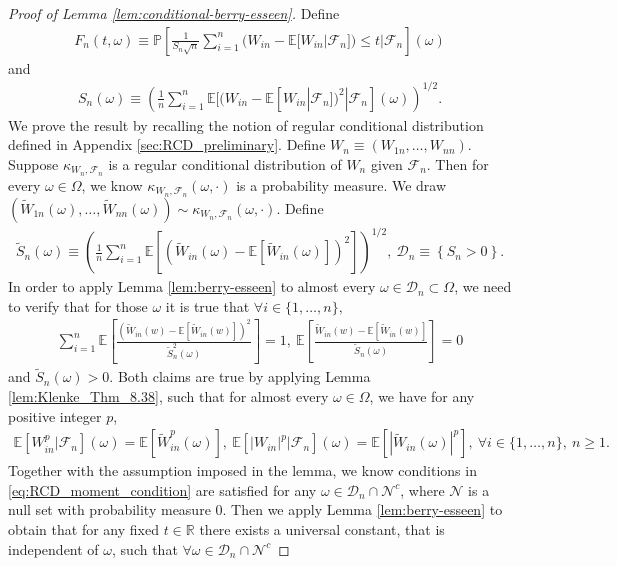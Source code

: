 \documentclass[12pt]{article}
\theoremstyle{definition}
\def\P{\mathbb{P}}
\def\P{\mathbb{P}}
\newcommand{\E}{\mathbb E}								%
\renewcommand{\P}{\mathbb{P}}							%
\begin{document}
	\begin{proof}[Proof of Lemma \ref{lem:conditional-berry-esseen}]
		Define 
		\begin{align*}
			F_n(t,\omega)\equiv \P\left[\frac{1}{S_n\sqrt{n}}\sum_{i=1}^n (W_{in}-\E[W_{in}|\mathcal{F}_n])\leq t|\mathcal{F}_n\right](\omega)
		\end{align*}
		and 
		\begin{align*}
			S_n(\omega)\equiv \left(\frac{1}{n}\sum_{i=1}^n \E[(W_{in}-\E[W_{in}|\mathcal{F}_n])^2|\mathcal{F}_n](\omega)\right)^{1/2}.
		\end{align*}
		We prove the result by recalling the notion of regular conditional distribution defined in Appendix \ref{sec:RCD_preliminary}. Define $W_n\equiv (W_{1n},\ldots,W_{nn})$. Suppose $\kappa_{W_n,\mathcal{F}_n}$ is a regular conditional distribution of $W_n$ given $\mathcal{F}_n$. Then for every $\omega\in\Omega$, we know $\kappa_{W_n,\mathcal{F}_n}(\omega,\cdot)$ is a probability measure. We draw $(\widetilde W_{1n}(\omega),\ldots,\widetilde{W}_{nn}(\omega))\sim \kappa_{W_n,\mathcal{F}_n}(\omega,\cdot)$. Define 
		\begin{align*}
			\widetilde S_n(\omega)\equiv \left(\frac{1}{n}\sum_{i=1}^n \E[(\widetilde{W}_{in}(\omega)-\E[\widetilde W_{in}(\omega)])^2]\right)^{1/2},\ \mathcal{D}_n\equiv \left\{S_n>0\right\}.
		\end{align*}
		In order to apply Lemma \ref{lem:berry-esseen} to almost every $\omega\in \mathcal{D}_n\subset \Omega$, we need to verify that for those $\omega$ it is true that $\forall  i\in \{1,\ldots,n\},$
		\begin{align}\label{eq:RCD_moment_condition}
			\sum_{i=1}^n\E\left[\frac{(\widetilde{W}_{in}(w)-\E[\widetilde{W}_{in}(w)])^2}{\widetilde S_n^2(\omega)}\right]=1,\ \E\left[\frac{\widetilde{W}_{in}(w)-\E[\widetilde{W}_{in}(w)]}{\widetilde S_n(\omega)}\right]=0
		\end{align}
		and $\widetilde S_n(\omega)>0$. Both claims are true by applying Lemma \ref{lem:Klenke_Thm_8.38}, such that for almost every $\omega\in\Omega$, we have for any positive integer $p$,
		\begin{align*}
			\E[W^p_{in}|\mathcal{F}_n](\omega)=\E[\widetilde{W}^p_{in}(\omega)],\ \E[|W_{in}|^p|\mathcal{F}_n](\omega)=\E[|\widetilde{W}_{in}(\omega)|^p],\ \forall i\in \{1,\ldots,n\},\ n\geq 1.
		\end{align*}
		Together with the assumption imposed in the lemma, we know conditions in \eqref{eq:RCD_moment_condition} are satisfied for any $\omega\in \mathcal{D}_n\cap \mathcal{N}^{c}$, where $\mathcal{N}$ is a null set with probability measure $0$. Then we apply Lemma \ref{lem:berry-esseen} to obtain that for any fixed $t\in\mathbb{R}$ there exists a universal constant, that is independent of $\omega$, such that $\forall \omega\in \mathcal{D}_n\cap \mathcal{N}^{c}$

\end{proof}
\end{document}
